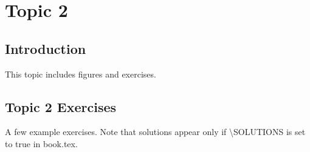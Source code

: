 \chapter{Topic 2}\label{chap:topic2}

\section{Introduction}\label{sec:topic2}
This topic includes figures and exercises.

\section{Topic 2 Exercises}\label{sec:topic2-exercises}
A few example exercises. Note that solutions appear only if \textbackslash SOLUTIONS is set to true in book.tex.

